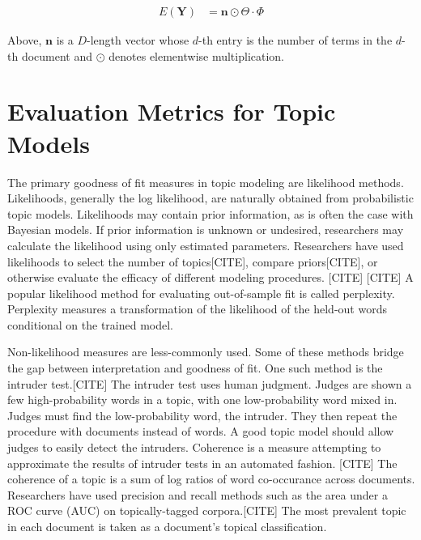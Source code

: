 \documentclass[conference,final,]{IEEEtran}
\begin{document}
\begin{align}
  E(\mathbf{Y}) &= \mathbf{n} \odot \Theta \cdot \Phi
\end{align}

Above, \(\mathbf{n}\) is a \(D\)-length vector whose \(d\)-th entry is
the number of terms in the \(d\)-th document and \(\odot\) denotes
elementwise multiplication.

\hypertarget{evaluation-metrics-for-topic-models}{%
\section{Evaluation Metrics for Topic
Models}\label{evaluation-metrics-for-topic-models}}

The primary goodness of fit measures in topic modeling are likelihood
methods. Likelihoods, generally the log likelihood, are naturally
obtained from probabilistic topic models. Likelihoods may contain prior
information, as is often the case with Bayesian models. If prior
information is unknown or undesired, researchers may calculate the
likelihood using only estimated parameters. Researchers have used
likelihoods to select the number of topics{[}CITE{]}, compare
priors{[}CITE{]}, or otherwise evaluate the efficacy of different
modeling procedures. {[}CITE{]} {[}CITE{]} A popular likelihood method
for evaluating out-of-sample fit is called perplexity. Perplexity
measures a transformation of the likelihood of the held-out words
conditional on the trained model.

Non-likelihood measures are less-commonly used. Some of these methods
bridge the gap between interpretation and goodness of fit. One such
method is the intruder test.{[}CITE{]} The intruder test uses human
judgment. Judges are shown a few high-probability words in a topic, with
one low-probability word mixed in. Judges must find the low-probability
word, the intruder. They then repeat the procedure with documents
instead of words. A good topic model should allow judges to easily
detect the intruders. Coherence is a measure attempting to approximate
the results of intruder tests in an automated fashion. {[}CITE{]} The
coherence of a topic is a sum of log ratios of word co-occurance across
documents. Researchers have used precision and recall methods such as
the area under a ROC curve (AUC) on topically-tagged corpora.{[}CITE{]}
The most prevalent topic in each document is taken as a document's
topical classification.
\end{document}
